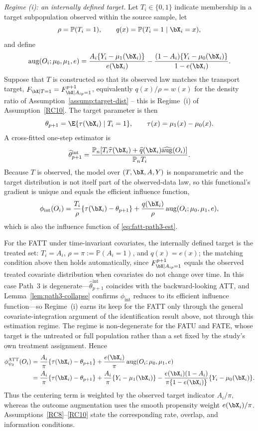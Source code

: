 \documentclass{article}
\renewcommand{\P}{\mathbb{P}}
\begin{document}
\emph{Regime (i): an internally defined target.}
Let $T_i \in \{0,1\}$ indicate membership in a target subpopulation observed within the source sample, let
\[
\rho = \P(T_i=1),
\qquad
q(x) = \P(T_i=1 \mid \bX_i=x),
\]
and define
\[
\operatorname{aug}(O_i;\mu_0,\mu_1,e)
=
\frac{A_i\{Y_i-\mu_1(\bX_i)\}}{e(\bX_i)}
-
\frac{(1-A_i)\{Y_i-\mu_0(\bX_i)\}}{1-e(\bX_i)}.
\]
Suppose that $T$ is constructed so that its observed law matches the transport target, $F_{\bX\mid T=1} = F_{\bX \mid A_{ip}=1}^{p+1}$, equivalently $q(x)/\rho = w(x)$ for the density ratio of Assumption~\ref{assump:target-dist} -- this is Regime~(i) of Assumption~\ref{RC10}. The target parameter is then
\[
\theta_{p+1}
=
\E\{\tau(\bX_i)\mid T_i=1\},
\qquad
\tau(x)=\mu_1(x)-\mu_0(x).
\]
A cross-fitted one-step estimator is
\begin{align}
\widehat{\theta}_{p+1}^{\mathrm{int}}
=
\frac{
\mathbb{P}_n\!\left[
T_i\widehat{\tau}(\bX_i)
+
\widehat q(\bX_i)
\widehat{\operatorname{aug}}(O_i)
\right]
}{
\mathbb{P}_n T_i
}.
\label{eq:fatt-path3-est}
\end{align}
Because $T$ is observed, the model over $(T,\bX,A,Y)$ is nonparametric and the target distribution is not itself part of the observed-data law, so this functional's gradient is unique and equals the efficient influence function,
\[
\phi_{\mathrm{int}}(O_i)
=
\frac{T_i}{\rho}
\{\tau(\bX_i)-\theta_{p+1}\}
+
\frac{q(\bX_i)}{\rho}
\operatorname{aug}(O_i;\mu_0,\mu_1,e),
\]
which is also the influence function of \eqref{eq:fatt-path3-est}.

For the FATT under time-invariant covariates, the internally defined target is the treated set: $T_i=A_i$, $\rho=\pi:=\P(A_i=1)$, and $q(x)=e(x)$; the matching condition above then holds automatically, since $F_{\bX|A_{ip}=1}^{p+1}$ equals the observed treated covariate distribution when covariates do not change over time. In this case Path~3 is degenerate---$\widehat\theta_{p+1}^{\mathrm{int}}$ coincides with the backward-looking ATT, and Lemma~\ref{lem:path3-collapse} confirms $\phi_{\mathrm{int}}$ reduces to its efficient influence function---so Regime~(i) earns its keep for the FATT only through the general covariate-integration argument of the identification result above, not through this estimation regime. The regime is non-degenerate for the FATU and FATE, whose target is the untreated or full population rather than a set fixed by the study's own treatment assignment. Hence
\begin{align}
\phi_{\psi_3}^{\mathrm{ATT}}(O_i)
&=
\frac{A_i}{\pi}
\{\tau(\bX_i)-\theta_{p+1}\}
+
\frac{e(\bX_i)}{\pi}
\operatorname{aug}(O_i;\mu_0,\mu_1,e)
\notag\\
&=
\frac{A_i}{\pi}
\{\tau(\bX_i)-\theta_{p+1}\}
+
\frac{A_i}{\pi}\{Y_i-\mu_1(\bX_i)\}
-
\frac{e(\bX_i)(1-A_i)}
{\pi\{1-e(\bX_i)\}}
\{Y_i-\mu_0(\bX_i)\}.
\label{eq:eif-path3}
\end{align}
Thus the centering term is weighted by the observed target indicator $A_i/\pi$, whereas the outcome augmentation uses the smooth propensity weight $e(\bX_i)/\pi$. Assumptions~\ref{RC8}--\ref{RC10} state the corresponding rate, overlap, and information conditions.
\end{document}
